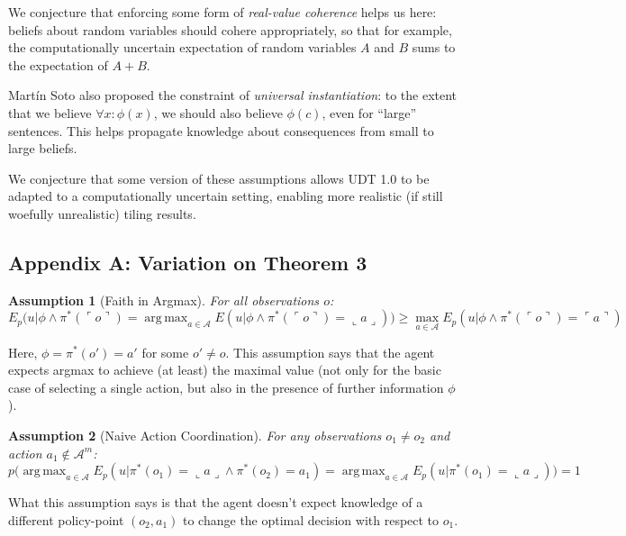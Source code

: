 \documentclass{article}
\newcommand{\qq}[1]{\ulcorner #1 \urcorner}
\newtheorem{assumption}{Assumption}
\DeclareMathOperator*{\argmax}{arg\,max}
\begin{document}
We conjecture that enforcing some form of \emph{real-value coherence} helps us here: beliefs about random variables should cohere appropriately, so that for example, the computationally uncertain expectation of random variables $A$ and $B$ sums to the expectation of $A+B$.

Martín Soto also proposed the constraint of \emph{universal instantiation}: to the extent that we believe $\forall x: \phi(x)$, we should also believe $\phi(c)$, even for ``large'' sentences. This helps propagate knowledge about consequences from small to large beliefs.

We conjecture that some version of these assumptions allows UDT 1.0 to be adapted to a computationally uncertain setting, enabling more realistic (if still woefully unrealistic) tiling results.





\appendix

\subsection*{Appendix A: Variation on Theorem 3}

\begin{assumption}[Faith in Argmax] \label{FAM-original}
For all observations $o$:
    $$E_p \big( u|\phi \wedge \pi^*(\qq{o}) = \argmax_{a \in \mathcal{A}} E(u|\phi \wedge \pi^*(\qq{o})=\llcorner a \lrcorner ) \big) \geq \max_{a \in \mathcal{A}} E_p(u|\phi \wedge \pi^*(\qq{o})=\qq{a})$$
\end{assumption}

Here, $\phi = \pi^*(o')=a'$ for some $o'\neq o$. This assumption says that the agent expects argmax to achieve (at least) the maximal value (not only for the basic case of selecting a single action, but also in the presence of further information $\phi$).

\begin{assumption}[Naive Action Coordination]
For any observations $o_1 \neq o_2$ and action $a_1 \not\in \mathcal{A}^m$:
$$ p\big(\argmax_{a \in \mathcal{A}} E_p(u|\pi^*(o_1)= \llcorner a \lrcorner \wedge \pi^*(o_2)=a_1) = \argmax_{a \in \mathcal{A}} E_p(u|\pi^*(o_1)=\llcorner a \lrcorner)\big) = 1 $$
\end{assumption}

What this assumption says is that the agent doesn't expect knowledge of a different policy-point $(o_2, a_1)$ to change the optimal decision with respect to $o_1$.
\end{document}
